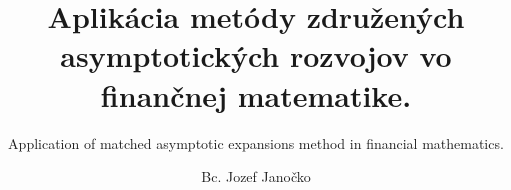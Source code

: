 \documentclass{beamer}
\title[short version for footline]{Aplikácia metódy združených asymptotických rozvojov vo finančnej matematike.}
\subtitle{Application of matched asymptotic expansions method in financial mathematics.}
\author%
{Bc. Jozef Janočko}
\institute[Universities Here and There] %
{

  Fakulta matematiky, fyziky a informatiky\\
  Univerzita Komenského
 }
\begin{document}
\frame{\titlepage}
\end{document}
